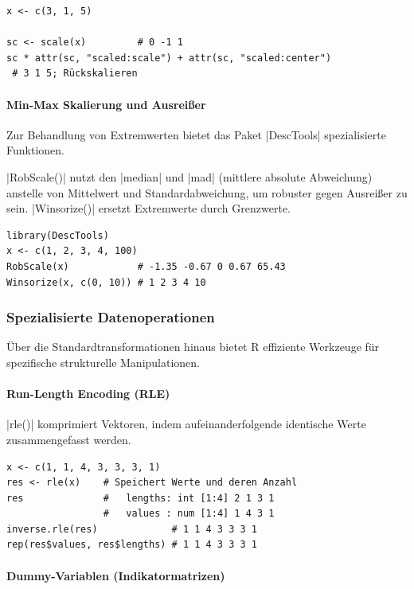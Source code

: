 \documentclass[10pt,twocolumn]{scrartcl}
\renewcommand{\lstinline}{\mycoloredinline}
\begin{document}
\begin{lstlisting}
x <- c(3, 1, 5)

sc <- scale(x)         # 0 -1 1
sc * attr(sc, "scaled:scale") + attr(sc, "scaled:center")
 # 3 1 5; Rückskalieren
\end{lstlisting}

\paragraph{Min-Max Skalierung und Ausreißer}

Zur Behandlung von Extremwerten bietet das Paket \lstinline|DescTools| spezialisierte Funktionen.

\lstinline|RobScale()| nutzt den \lstinline|median| und \lstinline|mad| (mittlere absolute Abweichung) anstelle von Mittelwert und Standardabweichung, um robuster gegen Ausreißer zu sein. \lstinline|Winsorize()| ersetzt Extremwerte durch Grenzwerte.

\begin{lstlisting}
library(DescTools)
x <- c(1, 2, 3, 4, 100)
RobScale(x)            # -1.35 -0.67 0 0.67 65.43
Winsorize(x, c(0, 10)) # 1 2 3 4 10
\end{lstlisting}


\subsubsection{Spezialisierte Datenoperationen}

Über die Standardtransformationen hinaus bietet R effiziente Werkzeuge für spezifische strukturelle Manipulationen.

\paragraph{Run-Length Encoding (RLE)}

\lstinline|rle()| komprimiert Vektoren, indem aufeinanderfolgende identische Werte zusammengefasst werden.

\begin{lstlisting}
x <- c(1, 1, 4, 3, 3, 3, 1)
res <- rle(x)    # Speichert Werte und deren Anzahl
res              #   lengths: int [1:4] 2 1 3 1
                 #   values : num [1:4] 1 4 3 1
inverse.rle(res)             # 1 1 4 3 3 3 1
rep(res$values, res$lengths) # 1 1 4 3 3 3 1
\end{lstlisting}

\paragraph{Dummy-Variablen (Indikatormatrizen)}
\end{document}
